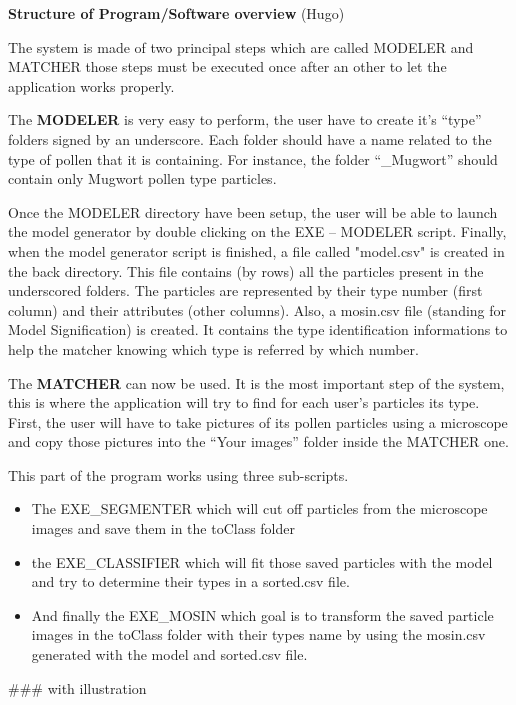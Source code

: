 \textbf{Structure of Program/Software overview} (Hugo) 

The system is made of two principal steps which are called MODELER and MATCHER those steps must be executed once after an other to let the application works properly.

The \textbf{MODELER} is very easy to perform, the user have to create it's “type” folders signed by an underscore.
Each folder should have a name related to the type of pollen that it is containing. For instance, the folder “\_Mugwort” should contain only Mugwort pollen type particles.

Once the MODELER directory have been setup, the user will be able to launch the model generator by double clicking on the EXE – MODELER script.
Finally, when the model generator script is finished, a file called "model.csv" is created in the back directory. This file contains (by rows) all the particles present in the underscored folders. The particles are represented by their type number (first column) and their attributes (other columns). Also, a mosin.csv file (standing for Model Signification) is created. It contains the type identification informations to help the matcher knowing which type is referred by which number.

The \textbf{MATCHER} can now be used. It is the most important step of the system, this is where the application will try to find for each user's particles its type.
First, the user will have to take pictures of its pollen particles using a microscope and copy those pictures into the “Your images” folder inside the MATCHER one.

This part of the program works using three sub-scripts.

\begin{itemize}
\item The EXE\_SEGMENTER which will cut off particles from the microscope images and save them in the toClass folder

\item the EXE\_CLASSIFIER which will fit those saved particles with the model and try to determine their types in a sorted.csv file.

\item And finally the EXE\_MOSIN which goal is to transform the saved particle images in the toClass folder with their types name by using the mosin.csv generated with the model and sorted.csv file.
\end{itemize}
### with illustration
    
    
    
    
    
    
    
    
    
    
    
    
    
    